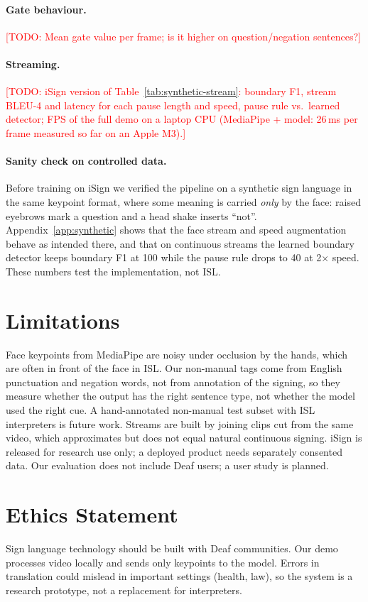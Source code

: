 \documentclass[11pt]{article}
\newcommand{\todo}[1]{\textcolor{red}{[TODO: #1]}}
\begin{document}
\paragraph{Gate behaviour.} \todo{Mean gate value per frame; is it higher on question/negation
sentences?}

\paragraph{Streaming.} \todo{iSign version of Table~\ref{tab:synthetic-stream}: boundary F1, stream
BLEU-4 and latency for each pause length and speed, pause rule vs.\ learned detector; FPS of the full demo
on a laptop CPU (MediaPipe + model: 26\,ms per frame measured so far on an Apple M3).}

\paragraph{Sanity check on controlled data.} Before training on iSign we verified the pipeline on a
synthetic sign language in the same keypoint format, where some meaning is carried \emph{only} by the
face: raised eyebrows mark a question and a head shake inserts ``not''. Appendix~\ref{app:synthetic}
shows that the face stream and speed augmentation behave as intended there, and that on continuous
streams the learned boundary detector keeps boundary F1 at 100 while the pause rule drops to 40 at
2$\times$ speed. These numbers test the implementation, not ISL.

\section{Limitations}\label{sec:limits}
Face keypoints from MediaPipe are noisy under occlusion by the hands, which are often in front of the
face in ISL. Our non-manual tags come from English punctuation and negation words, not from annotation of
the signing, so they measure whether the output has the right sentence type, not whether the model used
the right cue. A hand-annotated non-manual test subset with ISL interpreters is future work. Streams are
built by joining clips cut from the same video, which approximates but does not equal natural continuous
signing. iSign is released for research use only; a deployed product needs separately consented data.
Our evaluation does not include Deaf users; a user study is planned.

\section*{Ethics Statement}
Sign language technology should be built with Deaf communities. Our demo processes video locally and
sends only keypoints to the model. Errors in translation could mislead in important settings (health,
law), so the system is a research prototype, not a replacement for interpreters.
\end{document}
